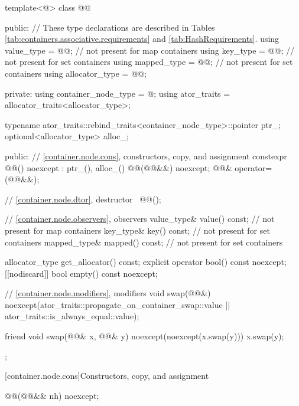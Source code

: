 \begin{codeblock}
template<@\unspecnc@>
class @@ {
public:
  // These type declarations are described in Tables \ref{tab:containers.associative.requirements} and \ref{tab:HashRequirements}.
  using value_type     = @\seebelownc{}@;     // not present for map containers
  using key_type       = @\seebelownc{}@;     // not present for set containers
  using mapped_type    = @\seebelownc{}@;     // not present for set containers
  using allocator_type = @\seebelownc{}@;

private:
  using container_node_type = @\unspecnc@;
  using ator_traits = allocator_traits<allocator_type>;

  typename ator_traits::rebind_traits<container_node_type>::pointer ptr_;
  optional<allocator_type> alloc_;

public:
  // \ref{container.node.cons}, constructors, copy, and assignment
  constexpr @@() noexcept : ptr_(), alloc_() {}
  @@(@@&&) noexcept;
  @@& operator=(@@&&);

  // \ref{container.node.dtor}, destructor
  ~@@();

  // \ref{container.node.observers}, observers
  value_type& value() const;            // not present for map containers
  key_type& key() const;                // not present for set containers
  mapped_type& mapped() const;          // not present for set containers

  allocator_type get_allocator() const;
  explicit operator bool() const noexcept;
  [[nodiscard]] bool empty() const noexcept;

  // \ref{container.node.modifiers}, modifiers
  void swap(@@&)
    noexcept(ator_traits::propagate_on_container_swap::value ||
             ator_traits::is_always_equal::value);

  friend void swap(@@& x, @@& y) noexcept(noexcept(x.swap(y))) {
    x.swap(y);
  }
};
\end{codeblock}

[container.node.cons]{Constructors, copy, and assignment}

\begin{itemdecl}
@@(@@&& nh) noexcept;
\end{itemdecl}

